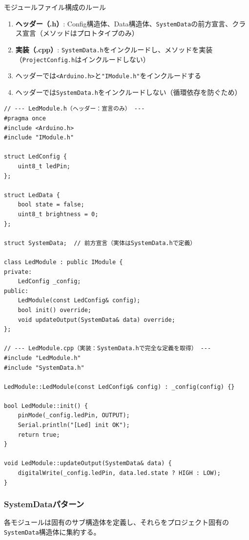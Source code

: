 \begin{funcblock}{モジュールファイル構成のルール}
\begin{enumerate}
    \item \textbf{ヘッダー（.h）}: Config構造体、Data構造体、\texttt{SystemData}の前方宣言、クラス宣言（メソッドはプロトタイプのみ）
    \item \textbf{実装（.cpp）}: \texttt{SystemData.h}をインクルードし、メソッドを実装（\texttt{ProjectConfig.h}はインクルードしない）
    \item ヘッダーでは\texttt{<Arduino.h>}と\texttt{"IModule.h"}をインクルードする
    \item ヘッダーでは\texttt{SystemData.h}をインクルードしない（循環依存を防ぐため）
\end{enumerate}
\end{funcblock}

\begin{lstlisting}[style=cppstyle, caption={モジュールのファイル構成例}]
// --- LedModule.h（ヘッダー：宣言のみ） ---
#pragma once
#include <Arduino.h>
#include "IModule.h"

struct LedConfig {
    uint8_t ledPin;
};

struct LedData {
    bool state = false;
    uint8_t brightness = 0;
};

struct SystemData;  // 前方宣言（実体はSystemData.hで定義）

class LedModule : public IModule {
private:
    LedConfig _config;
public:
    LedModule(const LedConfig& config);
    bool init() override;
    void updateOutput(SystemData& data) override;
};

// --- LedModule.cpp（実装：SystemData.hで完全な定義を取得） ---
#include "LedModule.h"
#include "SystemData.h"

LedModule::LedModule(const LedConfig& config) : _config(config) {}

bool LedModule::init() {
    pinMode(_config.ledPin, OUTPUT);
    Serial.println("[Led] init OK");
    return true;
}

void LedModule::updateOutput(SystemData& data) {
    digitalWrite(_config.ledPin, data.led.state ? HIGH : LOW);
}
\end{lstlisting}

\subsubsection{SystemDataパターン}
各モジュールは固有のサブ構造体を定義し、それらをプロジェクト固有の\texttt{SystemData}構造体に集約する。

